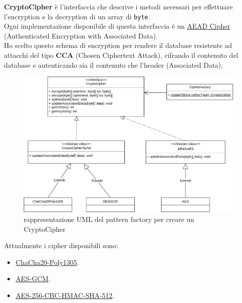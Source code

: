\documentclass[a4paper,12pt]{report}
\begin{document}
\textbf{CryptoCipher} è l'interfaccia che descrive i metodi necessari per effettuare
l'encryption e la decryption di un array di \texttt{byte}.\\
Ogni implementazione disponibile di questa interfaccia è un
\href{https://web.cs.ucdavis.edu/~rogaway/papers/ad.pdf}{AEAD Cipher} 
(Authenticated Encryption with Associated Data).\\
Ho scelto questo schema di encryption per rendere il database resistente ad 
attacchi del tipo \textbf{CCA} (Chosen Ciphertext Attack), cifrando il contenuto del
database e autenticando sia il contenuto che l'header (Associated Data).
\begin{figure}[h]
\centering{}
\includegraphics[width=\textwidth]{crypto-cipher}
\caption{rappresentazione UML del pattern factory per creare un CryptoCipher}
\end{figure}
Attualmente i cipher disponibili sono:
\begin{itemize}
  \item \href{https://tools.ietf.org/html/rfc7539}{ChaCha20-Poly1305}.
  \item \href{https://csrc.nist.gov/publications/detail/sp/800-38d/final}{AES-GCM}.
  \item \href{https://tools.ietf.org/html/draft-mcgrew-aead-aes-cbc-hmac-sha2-05}{AES-256-CBC-HMAC-SHA-512}.
\end{itemize}
\end{document}
